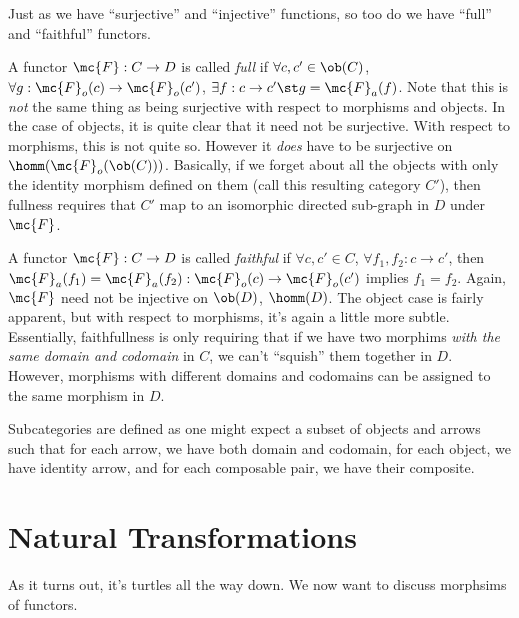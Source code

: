 Just as we have ``surjective'' and ``injective'' functions, so too do
we have ``full'' and ``faithful'' functors.\\

\begin{definition}
  A functor $\mc{F} : C \to D$ is called \emph{full} if $\forall c,c'
  \in \ob(C)$, $\forall g : \mc{F}_o(c) \to \mc{F}_o(c')$, $\exists f
  : c \to c' \st g = \mc{F}_a(f)$. Note that this is \emph{not} the
  same thing as being surjective with respect to morphisms and
  objects. In the case of objects, it is quite clear that it need not
  be surjective. With respect to morphisms, this is not quite so.
  However it \emph{does} have to be surjective on
  $\homm(\mc{F}_o(\ob(C)))$. Basically, if we forget about all the
  objects with only the identity morphism defined on them (call this
  resulting category $C'$), then fullness requires that $C'$ map to an
  isomorphic directed sub-graph in $D$ under $\mc{F}$.\\
\end{definition}

\begin{definition}
  A functor $\mc{F} : C \to D$ is called \emph{faithful} if $\forall
  c, c' \in C$, $\forall f_1, f_2 : c \to c'$, then $\mc{F}_a(f_1) =
  \mc{F}_a(f_2) : \mc{F}_o(c) \to \mc{F}_o(c')$ implies $f_1 = f_2$.
  Again, $\mc{F}$ need not be injective on $\ob(D)$, $\homm(D)$. The
  object case is fairly apparent, but with respect to morphisms, it's
  again a little more subtle. Essentially, faithfullness is only
  requiring that if we have two morphims \emph{with the same domain
    and codomain} in $C$, we can't ``squish'' them together in $D$.
  However, morphisms with different domains and codomains can be
  assigned to the same morphism in $D$.
\end{definition}

\begin{definition}
  Subcategories are defined as one might expect a subset of objects
  and arrows such that for each arrow, we have both domain and
  codomain, for each object, we have identity arrow, and for each
  composable pair, we have their composite.
\end{definition}

\section{Natural Transformations}
As it turns out, it's turtles all the way down. We now want to discuss
morphsims of functors.

